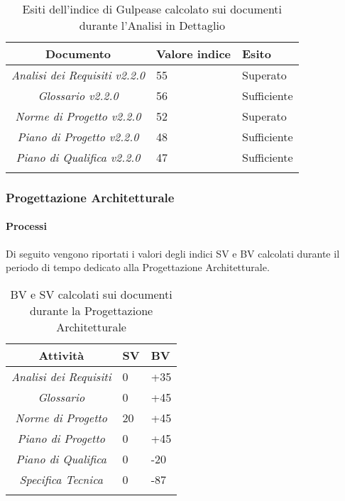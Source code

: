 \begin{longtable}{|c|p{3cm}|p{3cm}|}
\toprule
\textbf{Documento} & \textbf{Valore indice} & \textbf{Esito} \\


\midrule
\emph{Analisi dei Requisiti v2.2.0} & 55 & Superato \\
\midrule
\emph{Glossario v2.2.0} & 56 & Sufficiente\\
\midrule
\emph{Norme di Progetto v2.2.0} & 52 & Superato\\
\midrule
\emph{Piano di Progetto v2.2.0} & 48 & Sufficiente \\
\midrule
\emph{Piano di Qualifica v2.2.0} & 47 & Sufficiente \\
\bottomrule
\caption{Esiti dell'indice di Gulpease calcolato sui documenti durante l'Analisi in Dettaglio}
\label{tab:changelog}
\end{longtable}

\subsubsection{Progettazione Architetturale}
\paragraph{Processi}
Di seguito vengono riportati i valori degli indici SV e BV calcolati durante il periodo di tempo dedicato alla Progettazione Architetturale.
\begin{longtable}{|c|p{3cm}|p{3cm}|}
\toprule
\textbf{Attività} & \textbf{SV} & \textbf{BV} \\


\midrule
\emph{Analisi dei Requisiti} & 0 & +35\\
\midrule
\emph{Glossario} & 0  & +45\\
\midrule
\emph{Norme di Progetto} & 20 & +45\\
\midrule
\emph{Piano di Progetto} & 0 & +45 \\
\midrule
\emph{Piano di Qualifica} & 0 & -20\\
\midrule
\emph{Specifica Tecnica} & 0 & -87\\
\bottomrule
\caption{BV e SV calcolati sui documenti durante la Progettazione Architetturale}
\label{tab:changelog}
\end{longtable}

